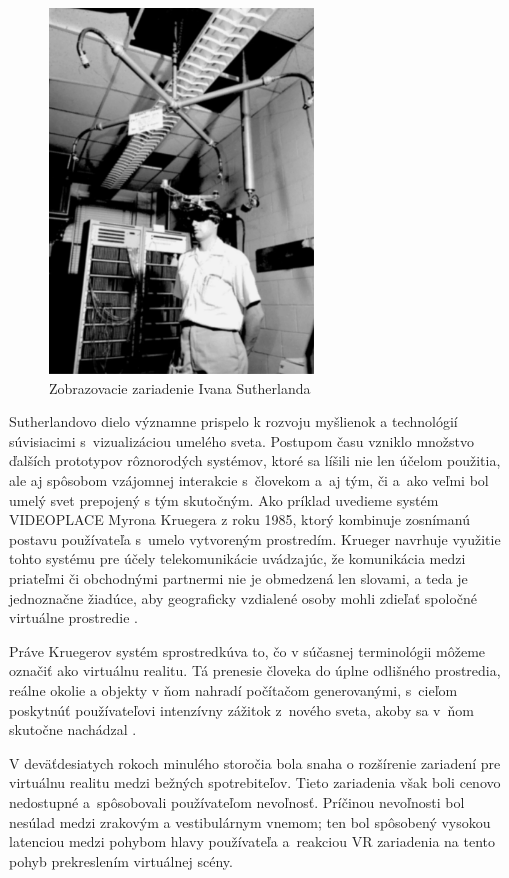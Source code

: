 \begin{figure}[!htbp]
  \centering
  \includegraphics[width=7cm]{img/display-device-Ivan-Sutherland-Harvard-University-1967.jpg}
  \caption{Zobrazovacie zariadenie Ivana Sutherlanda}
  \label{sutherland-device}
\end{figure}	

Sutherlandovo dielo významne prispelo k rozvoju myšlienok a technológií súvisiacimi s~vizualizáciou umelého sveta. Postupom času vzniklo množstvo ďalších 
prototypov rôznorodých systémov, ktoré sa líšili nie len účelom použitia, ale aj spôsobom vzájomnej interakcie s~človekom a~aj tým, či a~ako veľmi bol umelý 
svet prepojený s tým skutočným. Ako príklad uvedieme systém VIDEOPLACE Myrona Kruegera z roku 1985, ktorý kombinuje zosnímanú postavu používateľa s~umelo vytvoreným 
prostredím. Krueger navrhuje využitie tohto systému pre účely telekomunikácie uvádzajúc, že komunikácia medzi priateľmi či obchodnými partnermi nie je 
obmedzená len slovami, a teda je jednoznačne žiadúce, aby geograficky vzdialené osoby mohli zdieľať spoločné virtuálne prostredie 
\cite{kruegerVIDEOPLACEArtificialReality1985}.

Práve Kruegerov systém sprostredkúva to, čo v súčasnej terminológii môžeme označiť ako virtuálnu realitu. Tá prenesie človeka do úplne odlišného prostredia, 
reálne okolie a objekty v ňom nahradí počítačom generovanými, s~cieľom poskytnúť používateľovi intenzívny zážitok z~nového sveta, akoby sa v~ňom skutočne nachádzal
\cite{brighamRealityCheckBasics2017}. 

V deväťdesiatych rokoch minulého storočia bola snaha o rozšírenie zariadení pre virtuálnu realitu medzi bežných spotrebiteľov. Tieto zariadenia však boli cenovo
nedostupné a~spôsobovali používateľom nevoľnosť. Príčinou nevoľnosti bol nesúlad medzi zrakovým a vestibulárnym vnemom; ten bol spôsobený vysokou latenciou medzi pohybom 
hlavy používateľa a~reakciou VR zariadenia na tento pohyb prekreslením virtuálnej scény. 

